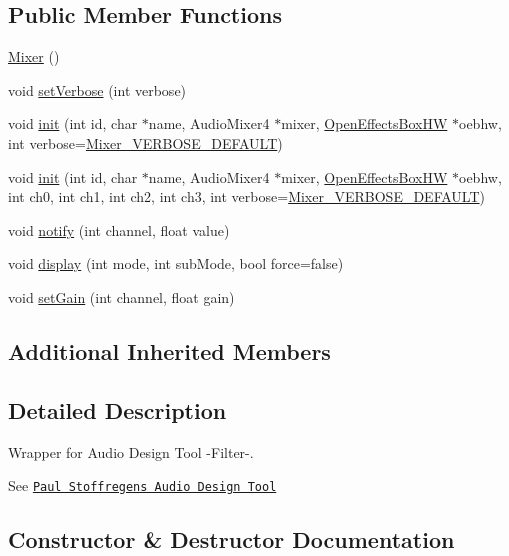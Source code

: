 \subsection*{Public Member Functions}
\begin{DoxyCompactItemize}
\item 
\mbox{\hyperlink{class_mixer_aedb32c0b9d526c8c3565311bab44a0fb}{Mixer}} ()
\item 
void \mbox{\hyperlink{class_mixer_ae6922f1a38efc4a5f7bee94841248086}{set\+Verbose}} (int verbose)
\item 
void \mbox{\hyperlink{class_mixer_a2fb26b5f207f864ed15db5ae6ae69850}{init}} (int id, char $\ast$name, Audio\+Mixer4 $\ast$mixer, \mbox{\hyperlink{class_open_effects_box_h_w}{Open\+Effects\+Box\+HW}} $\ast$oebhw, int verbose=\mbox{\hyperlink{_mixer_8h_a7eb69210314d4537532d2124499318b3}{Mixer\+\_\+\+V\+E\+R\+B\+O\+S\+E\+\_\+\+D\+E\+F\+A\+U\+LT}})
\item 
void \mbox{\hyperlink{class_mixer_ac6c290ada657f8325a59f37cafaf0c0c}{init}} (int id, char $\ast$name, Audio\+Mixer4 $\ast$mixer, \mbox{\hyperlink{class_open_effects_box_h_w}{Open\+Effects\+Box\+HW}} $\ast$oebhw, int ch0, int ch1, int ch2, int ch3, int verbose=\mbox{\hyperlink{_mixer_8h_a7eb69210314d4537532d2124499318b3}{Mixer\+\_\+\+V\+E\+R\+B\+O\+S\+E\+\_\+\+D\+E\+F\+A\+U\+LT}})
\item 
void \mbox{\hyperlink{class_mixer_a73177ee1e071909ef23ff2e913eb6cbc}{notify}} (int channel, float value)
\item 
void \mbox{\hyperlink{class_mixer_a13c7c7e025c83d2f9a22b4c16b400551}{display}} (int mode, int sub\+Mode, bool force=false)
\item 
void \mbox{\hyperlink{class_mixer_ab8ff46ce57c3c783de4cefbb6f86b1cc}{set\+Gain}} (int channel, float gain)
\end{DoxyCompactItemize}
\subsection*{Additional Inherited Members}


\subsection{Detailed Description}
Wrapper for Audio Design Tool -\/\+Filter-\/. 

See \href{https://www.pjrc.com/teensy/gui/}{\tt Paul Stoffregen\textquotesingle{}s Audio Design Tool} 

\subsection{Constructor \& Destructor Documentation}
\mbox{\label{class_mixer_aedb32c0b9d526c8c3565311bab44a0fb}} 
